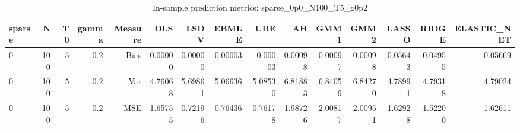 \begin{table}[!htbp]\centering
\caption{In-sample prediction metrics: sparse_0p0_N100_T5_g0p2}
\label{tab:table2_sparse_0p0_N100_T5_g0p2}
\begin{tabular}{lrrrrrrrrrrrrrr}
\hline
sparse & N & T0 & gamma & Measure & OLS & LSDV & EBMLE & URE & AH & GMM1 & GMM2 & LASSO & RIDGE & ELASTIC_NET \\
\hline
0 & 100 & 5 & 0.2 & Bias & 0.00000 & 0.00000 & 0.00003 & -0.00003 & 0.00098 & 0.00097 & 0.00098 & 0.05643 & 0.04955 & 0.05669 \\
0 & 100 & 5 & 0.2 & Var & 4.76068 & 5.69861 & 5.06636 & 5.08530 & 6.81883 & 6.84059 & 6.84270 & 4.78991 & 4.79318 & 4.79024 \\
0 & 100 & 5 & 0.2 & MSE & 1.65755 & 0.72196 & 0.76436 & 0.76178 & 1.98726 & 2.00817 & 2.00951 & 1.62928 & 1.52200 & 1.62611 \\
\hline
\end{tabular}
\end{table}

